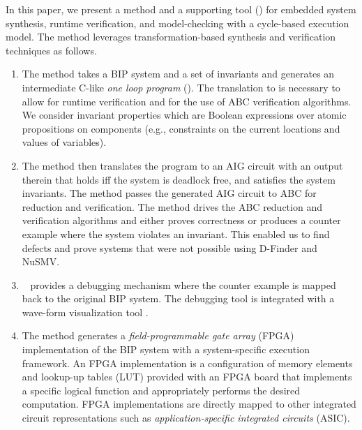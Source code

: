 In this paper, we present a method and a supporting tool (\biptool)
for embedded system synthesis, runtime verification,
and model-checking with a cycle-based execution model.
The method leverages transformation-based synthesis and verification techniques 
as follows. 
%
\begin{enumerate}
\item The method takes a BIP system and a set of invariants and generates 
  an intermediate C-like {\em one loop program } (\caig). 
  The translation to \caig is necessary to allow for runtime verification and for the use
  of ABC verification algorithms. We consider invariant properties which are Boolean expressions
over atomic propositions on components (e.g., constraints on the current locations and values of variables).

\item The method then translates the \caig program to 
  an AIG circuit with an output therein that holds iff the system 
  is deadlock free, and satisfies the system invariants. 
  The method passes the generated AIG circuit to ABC for reduction and 
  verification. 
  The method drives the ABC reduction and verification algorithms and 
  either proves correctness or produces a counter example where the 
  system violates an invariant. 
  This enabled us to find defects and prove systems that were not 
  possible using D-Finder and NuSMV. 

\item  \biptool~ provides a debugging mechanism where the 
  counter example is mapped back to the original BIP system. 
  The debugging tool is integrated with a wave-form visualization tool 
  \cite{bybell2010gtkwave}.  
\item The method generates a {\em field-programmable gate array} (FPGA) 
  implementation of the BIP system with a 
  system-specific execution framework. 
  An FPGA implementation is a configuration of 
  memory elements and lookup-up tables (LUT) provided with an FPGA board
  that implements a specific logical function
  and appropriately performs the desired computation. 
  FPGA implementations are directly mapped to other integrated circuit representations
  such as {\em application-specific integrated circuits} (ASIC). 


\end{enumerate}

